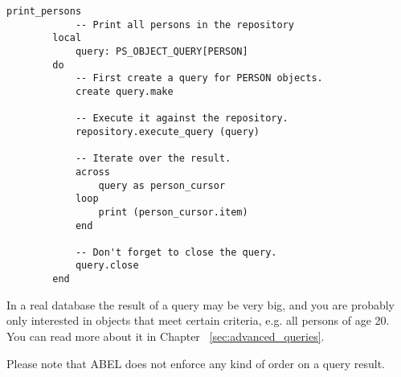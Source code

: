 \documentclass[a4paper,12pt]{report}
\begin{document}
\begin{lstlisting}[language=OOSC2Eiffel, captionpos=b, caption={Print all PERSON objects.}, label={lst:simple_query}]
	print_persons
			-- Print all persons in the repository
		local
			query: PS_OBJECT_QUERY[PERSON]
		do
			-- First create a query for PERSON objects.
			create query.make

			-- Execute it against the repository.
			repository.execute_query (query)

			-- Iterate over the result.
			across
				query as person_cursor
			loop
				print (person_cursor.item)
			end

			-- Don't forget to close the query.
			query.close
		end
\end{lstlisting}
In a real database the result of a query may be very big, and you are probably only interested in objects that meet certain criteria, e.g. all persons of age 20. 
You can read more about it in Chapter ~\ref{sec:advanced_queries}.

Please note that ABEL does not enforce any kind of order on a query result.

%
%
%
%
\end{document}

